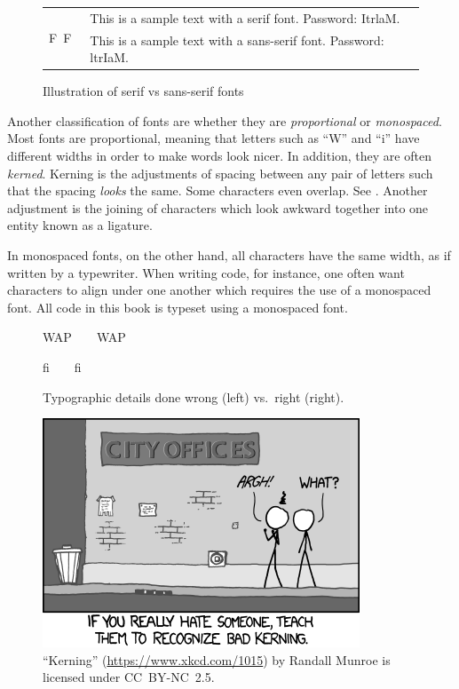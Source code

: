 {\begin{figure}
	\centering
	\begin{tabular}{ll}
		\multirow{2}{*}{\noindent\hfill{\Huge F}~{\Huge \textsf{F}}\hfill~}	
		&	This is a sample text with a serif font. Password: ItrlaM.	\\
		&	\textsf{This is a sample text with a sans-serif font. Password: ltrIaM.}
	\end{tabular}
	\caption{Illustration of serif vs sans-serif fonts}
	\label{fig:latex:serif}
\end{figure}

Another classification of fonts are whether they are \emph{proportional} or \emph{monospaced}. Most fonts are proportional, meaning that letters such as ``W'' and ``i'' have different widths in order to make words look nicer. In addition, they are often \emph{kerned}. Kerning is the adjustments of spacing between any pair of letters such that the spacing \emph{looks} the same. Some characters even overlap. See . Another adjustment is the joining of characters which look awkward together into one entity known as a ligature.

In monospaced fonts, on the other hand, all characters have the same width, as if written by a typewriter. When writing code, for instance, one often want characters to align under one another which requires the use of a monospaced font. All code in this book is typeset using a monospaced font.


\begin{figure}
	\centering
	\begin{minipage}[b]{0.49\linewidth}
		\centering
		{\Huge W{}AP}~~~~{\Huge WAP}
	\end{minipage}%
	\begin{minipage}[b]{0.49\linewidth}
		\centering
		{\Huge f{}i}~~~~{\Huge fi}
	\end{minipage}%
	\caption{Typographic details done wrong (left) vs.\ right (right).}
	\label{fig:latex:ligature}	
\end{figure}


\begin{figure}
	\centering
	\includegraphics[scale=1,resolution=150]{graphics/kerning.png}
	\caption{``Kerning'' (\url{https://www.xkcd.com/1015}) by Randall Munroe is licensed under \mbox{CC~BY-NC~2.5}.}
	\label{fig:latex:unicode}
\end{figure}

}
